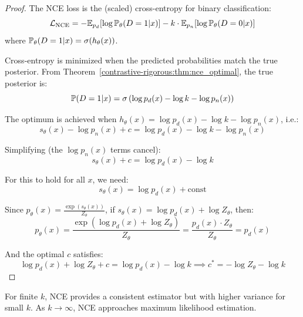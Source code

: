 \begin{notechapter}
\begin{proof}
The NCE loss is the (scaled) cross-entropy for binary classification:
\begin{equation}
\mathcal{L}_{\text{NCE}} = -\mathbb{E}_{p_d}[\log \mathbb{P}_\theta(D=1|x)] - k \cdot \mathbb{E}_{p_n}[\log \mathbb{P}_\theta(D=0|x)]
\end{equation}
where $\mathbb{P}_\theta(D=1|x) = \sigma(h_\theta(x))$.

Cross-entropy is minimized when the predicted probabilities match the true posterior. From Theorem~\ref{contrastive-rigorous:thm:nce_optimal}, the true posterior is:
\begin{equation}
\mathbb{P}(D = 1 | x) = \sigma\left(\log p_d(x) - \log k - \log p_n(x)\right)
\end{equation}

The optimum is achieved when $h_\theta(x) = \log p_d(x) - \log k - \log p_n(x)$, i.e.:
\begin{equation}
s_\theta(x) - \log p_n(x) + c = \log p_d(x) - \log k - \log p_n(x)
\end{equation}

Simplifying (the $\log p_n(x)$ terms cancel):
\begin{equation}
s_\theta(x) + c = \log p_d(x) - \log k
\end{equation}

For this to hold for all $x$, we need:
\begin{equation}
s_\theta(x) = \log p_d(x) + \text{const}
\end{equation}

Since $p_\theta(x) = \frac{\exp(s_\theta(x))}{Z_\theta}$, if $s_\theta(x) = \log p_d(x) + \log Z_\theta$, then:
\begin{equation}
p_\theta(x) = \frac{\exp(\log p_d(x) + \log Z_\theta)}{Z_\theta} = \frac{p_d(x) \cdot Z_\theta}{Z_\theta} = p_d(x)
\end{equation}

And the optimal $c$ satisfies:
\begin{equation}
\log p_d(x) + \log Z_\theta + c = \log p_d(x) - \log k \implies c^* = -\log Z_\theta - \log k
\end{equation}
\end{proof}

\begin{remark}[Finite $k$]
For finite $k$, NCE provides a consistent estimator but with higher variance for small $k$. As $k \to \infty$, NCE approaches maximum likelihood estimation.
\end{remark}


\end{notechapter}
